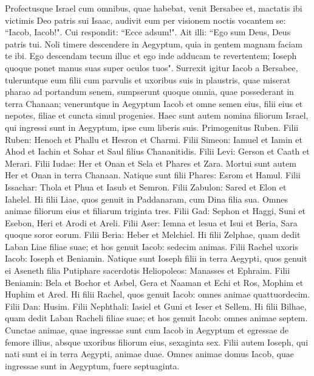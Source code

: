\begin{biblechapter}  
\verse Profectusque Israel cum omnibus, quae habebat, venit Bersabee et, mactatis ibi victimis Deo patris sui Isaac, 
\verse audivit eum per visionem noctis vocantem se: “Iacob, Iacob!". Cui respondit: “Ecce adsum!". 
\verse Ait illi: “Ego sum Deus, Deus patris tui. Noli timere descendere in Aegyptum, quia in gentem magnam faciam te ibi. 
\verse Ego descendam tecum illuc et ego inde adducam te revertentem; Ioseph quoque ponet manus suas super oculos tuos". 
\verse Surrexit igitur Iacob a Bersabee, tuleruntque eum filii cum parvulis et uxoribus suis in plaustris, quae miserat pharao ad portandum senem, 
\verse sumpserunt quoque omnia, quae possederant in terra Chanaan; veneruntque in Aegyptum Iacob et omne semen eius, 
\verse filii eius et nepotes, filiae et cuncta simul progenies. 
\verse Haec sunt autem nomina filiorum Israel, qui ingressi sunt in Aegyptum, ipse cum liberis suis. Primogenitus Ruben. 
\verse Filii Ruben: Henoch et Phallu et Hesron et Charmi. 
\verse Filii Simeon: Iamuel et Iamin et Ahod et Iachin et Sohar et Saul filius Chananitidis. 
\verse Filii Levi: Gerson et Caath et Merari. 
\verse Filii Iudae: Her et Onan et Sela et Phares et Zara. Mortui sunt autem Her et Onan in terra Chanaan. Natique sunt filii Phares: Esrom et Hamul. 
\verse Filii Issachar: Thola et Phua et Iasub et Semron. 
\verse Filii Zabulon: Sared et Elon et Iahelel. 
\verse Hi filii Liae, quos genuit in Paddanaram, cum Dina filia sua. Omnes animae filiorum eius et filiarum triginta tres. 
\verse Filii Gad: Sephon et Haggi, Suni et Esebon, Heri et Arodi et Areli. 
\verse Filii Aser: Iemna et lesua et Isui et Beria, Sara quoque soror eorum. Filii Beria: Heber et Melchiel. 
\verse Hi filii Zelphae, quam dedit Laban Liae filiae suae; et hos genuit Iacob: sedecim animas. 
\verse Filii Rachel uxoris Iacob: Ioseph et Beniamin. 
\verse Natique sunt Ioseph filii in terra Aegypti, quos genuit ei Aseneth filia Putiphare sacerdotis Heliopoleos: Manasses et Ephraim. 
\verse Filii Beniamin: Bela et Bochor et Asbel, Gera et Naaman et Echi et Ros, Mophim et Huphim et Ared. 
\verse Hi filii Rachel, quos genuit Iacob: omnes animae quattuordecim. 
\verse Filii Dan: Husim. 
\verse Filii Nephthali: Iasiel et Guni et Ieser et Sellem. 
\verse Hi filii Bilhae, quam dedit Laban Racheli filiae suae; et hos genuit Iacob: omnes animae septem. 
\verse Cunctae animae, quae ingressae sunt cum Iacob in Aegyptum et egressae de femore illius, absque uxoribus filiorum eius, sexaginta sex. 
\verse Filii autem Ioseph, qui nati sunt ei in terra Aegypti, animae duae. Omnes animae domus Iacob, quae ingressae sunt in Aegyptum, fuere septuaginta. 

\end{biblechapter}
